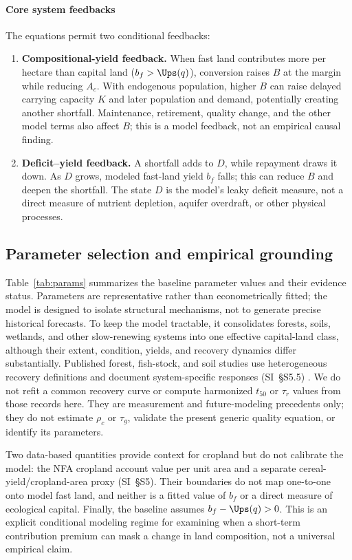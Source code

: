 \paragraph{Core system feedbacks} The equations permit two conditional feedbacks:
\begin{enumerate}
  \item \textbf{Compositional-yield feedback.} When fast land contributes more per hectare than capital land ($b_f>\Ups(q)$), conversion raises $B$ at the margin while reducing $A_c$. With endogenous population, higher $B$ can raise delayed carrying capacity $K$ and later population and demand, potentially creating another shortfall. Maintenance, retirement, quality change, and the other model terms also affect $B$; this is a model feedback, not an empirical causal finding.
  \item \textbf{Deficit--yield feedback.} A shortfall adds to $D$, while repayment draws it down. As $D$ grows, modeled fast-land yield $b_f$ falls; this can reduce $B$ and deepen the shortfall. The state $D$ is the model's leaky deficit measure, not a direct measure of nutrient depletion, aquifer overdraft, or other physical processes.
\end{enumerate}

\subsection{Parameter selection and empirical grounding}\label{sec:params}

Table~\ref{tab:params} summarizes the baseline parameter values and their evidence status. Parameters are representative rather than econometrically fitted; the model is designed to isolate structural mechanisms, not to generate precise historical forecasts. To keep the model tractable, it consolidates forests, soils, wetlands, and other slow-renewing systems into one effective capital-land class, although their extent, condition, yields, and recovery dynamics differ substantially. Published forest, fish-stock, and soil studies use heterogeneous recovery definitions and document system-specific responses (SI~\S S5.5) \citep{Poorter2016,HutchingsReynolds2004,Neubauer2013,Poeplau2011}. We do not refit a common recovery curve or compute harmonized $t_{50}$ or $\tau_r$ values from those records here. They are measurement and future-modeling precedents only; they do not estimate $\rho_c$ or $\tau_g$, validate the present generic quality equation, or identify its parameters.

Two data-based quantities provide context for cropland but do not calibrate the model: the NFA cropland account value per unit area and a separate cereal-yield/cropland-area proxy (SI~\S S5). Their boundaries do not map one-to-one onto model fast land, and neither is a fitted value of $b_f$ or a direct measure of ecological capital. Finally, the baseline assumes $b_f-\Ups(q)>0$. This is an explicit conditional modeling regime for examining when a short-term contribution premium can mask a change in land composition, not a universal empirical claim.

